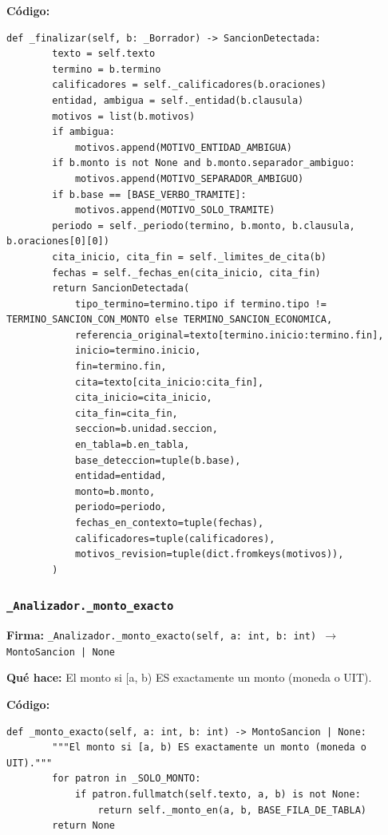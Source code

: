 \documentclass[11pt,a4paper]{article}
\begin{document}
\textbf{Código:}
\begin{lstlisting}
def _finalizar(self, b: _Borrador) -> SancionDetectada:
        texto = self.texto
        termino = b.termino
        calificadores = self._calificadores(b.oraciones)
        entidad, ambigua = self._entidad(b.clausula)
        motivos = list(b.motivos)
        if ambigua:
            motivos.append(MOTIVO_ENTIDAD_AMBIGUA)
        if b.monto is not None and b.monto.separador_ambiguo:
            motivos.append(MOTIVO_SEPARADOR_AMBIGUO)
        if b.base == [BASE_VERBO_TRAMITE]:
            motivos.append(MOTIVO_SOLO_TRAMITE)
        periodo = self._periodo(termino, b.monto, b.clausula, b.oraciones[0][0])
        cita_inicio, cita_fin = self._limites_de_cita(b)
        fechas = self._fechas_en(cita_inicio, cita_fin)
        return SancionDetectada(
            tipo_termino=termino.tipo if termino.tipo != TERMINO_SANCION_CON_MONTO else TERMINO_SANCION_ECONOMICA,
            referencia_original=texto[termino.inicio:termino.fin],
            inicio=termino.inicio,
            fin=termino.fin,
            cita=texto[cita_inicio:cita_fin],
            cita_inicio=cita_inicio,
            cita_fin=cita_fin,
            seccion=b.unidad.seccion,
            en_tabla=b.en_tabla,
            base_deteccion=tuple(b.base),
            entidad=entidad,
            monto=b.monto,
            periodo=periodo,
            fechas_en_contexto=tuple(fechas),
            calificadores=tuple(calificadores),
            motivos_revision=tuple(dict.fromkeys(motivos)),
        )
\end{lstlisting}

\subsubsection*{\texttt{\_Analizador.\_monto\_exacto}}
\textbf{Firma:} \texttt{\_Analizador.\_monto\_exacto(self, a: int, b: int) $\rightarrow$ MontoSancion | None}

\textbf{Qué hace:} El monto si [a, b) ES exactamente un monto (moneda o UIT).

\textbf{Código:}
\begin{lstlisting}
def _monto_exacto(self, a: int, b: int) -> MontoSancion | None:
        """El monto si [a, b) ES exactamente un monto (moneda o UIT)."""
        for patron in _SOLO_MONTO:
            if patron.fullmatch(self.texto, a, b) is not None:
                return self._monto_en(a, b, BASE_FILA_DE_TABLA)
        return None
\end{lstlisting}
\end{document}
